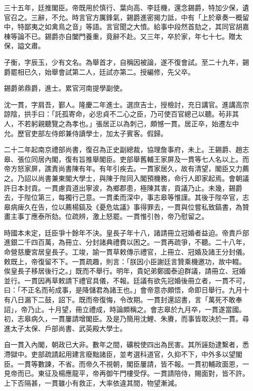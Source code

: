 \begin{pinyinscope}
三十五年，廷推閣臣。帝既用於慎行、葉向高、李廷機，還念錫爵，特加少保，遺官召之。三辭，不允。時言官方厲鋒氣，錫爵進密揭力詆，中有「上於章奏一概留中，特鄙夷之如禽鳥之音」等語。言官聞之大憤。給事中段然首劾之，其同官胡嘉棟等論不已。錫爵亦自闔門養重，竟辭不赴。又三年，卒於家，年七十七。贈太保，謚文肅。

子衡，字辰玉，少有文名。為舉首才，自稱因被論，遂不復會試。至二十九年，錫爵罷相已久，始舉會試第二人，廷試亦第二。授編修，先父卒。

錫爵弟鼎爵，進士。累官河南提學副使。

沈一貫，字肩吾，鄞人。隆慶二年進士。選庶吉士，授檢討，充日講官。進講高宗諒陰，拱手曰：「託孤寄命，必忠貞不二心之臣，乃可使百官總己以聽。茍非其人，不若躬親聽覽之為孝也。」張居正以為刺己，頗憾一貫。居正卒，始遷左中允。歷官吏部左侍郎兼侍讀學士，加太子賓客。假歸。

二十二年起南京禮部尚書，復召為正史副總裁，協理詹事府，未上。王錫爵、趙志皋、張位同居內閣，復有旨推舉閣臣。吏部舉舊輔王家屏及一貫等七人名以上。而帝方怒家屏，譙責尚書陳有年。有年引疾去。一貫家居久，故有清望，閣臣又力薦之。乃詔以尚書兼東閣大學士，與陳于陛同入閣預機務，命行人即家起焉。會朝議許日本封貢。一貫慮貢道出寧波，為鄉郡患，極陳其害，貢議乃止。未幾，錫爵去，于陛位第三，每獨行己意。一貫柔而深中，事志皋等惟謹。其後于陛卒官，志皋病痺久在告，位以薦楊鎬及《憂危竑議》事得罪去，一貫與位嘗私致鎬書，為贊畫主事丁應泰所劾。位疏辨，激上怒罷。一貫惟引咎，帝乃慰留之。

時國本未定，廷臣爭十餘年不決。皇長子年十八，諸請冊立冠婚者益迫。帝責戶部進銀二千四百萬，為冊立、分封諸典禮費以困之。一貫再疏爭，不聽。二十八年，命營慈慶宮居皇長子。工竣，諭一貫草敕傳示禮官，上冊立、冠婚及諸王分封儀。敕既上，帝復留不下。一貫疏趣，則言：「朕因小臣謝廷言贊乘機邀功，故中輟。俟皇長子移居後行之。」既而不舉行。明年，貴妃弟鄭國泰迫群議，請冊立、冠婚並行。一貫因再草敕請下禮官具儀，不報。廷議有欲先冠婚後冊立者，一貫不可，曰：「不正名而茍成事，是降儲君為諸王也。」會帝意亦頗悟，命即日舉行。九月十有八日漏下二鼓，詔下。既而帝復悔，令改期。一貫封還詔書，言「萬死不敢奉詔」，帝乃止。十月望，冊立禮成，時論頗稱之。會志皋於九月卒，一貫遂當國。初，志皋病久，一貫屢請增閣臣。及是乃簡用沈鯉、朱賡，而事皆取決於一貫。尋進太子太保、戶部尚書、武英殿大學士。

自一貫入內閣，朝政已大非。數年之間，礦稅使四出為民害。其所誣劾逮繫者，悉滯獄中。吏部疏請起用建言廢黜諸臣，並考選科道官，久抑不下，中外多以望閣臣。一貫等數諫，不省。而帝久不視朝，閣臣屢請，皆不報。一貫初輔政面恩，一見帝而已。東征及楊應龍平，帝再御午門樓受俘。一貫請陪侍，賜面對，皆不許。上下否隔甚，一貫雖小有救正，大率依違其間，物望漸減。


\end{pinyinscope}
